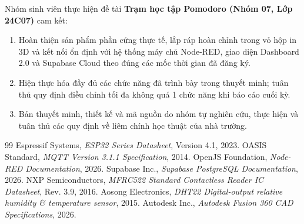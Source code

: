 Nhóm sinh viên thực hiện đề tài \textbf{Trạm học tập Pomodoro (Nhóm 07, Lớp 24C07)} cam kết:
\begin{enumerate}[leftmargin=1.0cm, noitemsep, topsep=1pt]
    \item Hoàn thiện sản phẩm phần cứng thực tế, lắp ráp hoàn chỉnh trong vỏ hộp in 3D và kết nối ổn định với hệ thống máy chủ Node-RED, giao diện Dashboard 2.0 và Supabase Cloud theo đúng các mốc thời gian đã đăng ký.
    \item Hiện thực hóa đầy đủ các chức năng đã trình bày trong thuyết minh; tuân thủ quy định điều chỉnh tối đa không quá 1 chức năng khi báo cáo cuối kỳ.
    \item Bản thuyết minh, thiết kế và mã nguồn do nhóm tự nghiên cứu, thực hiện và tuân thủ các quy định về liêm chính học thuật của nhà trường.
\end{enumerate}

\begin{thebibliography}{99}
    \setlength{\itemsep}{0pt}
    \setlength{\parskip}{0pt}
    \small
     Espressif Systems, \textit{ESP32 Series Datasheet}, Version 4.1, 2023.
     OASIS Standard, \textit{MQTT Version 3.1.1 Specification}, 2014.
     OpenJS Foundation, \textit{Node-RED Documentation}, 2026.
     Supabase Inc., \textit{Supabase PostgreSQL Documentation}, 2026.
     NXP Semiconductors, \textit{MFRC522 Standard Contactless Reader IC Datasheet}, Rev. 3.9, 2016.
     Aosong Electronics, \textit{DHT22 Digital-output relative humidity \& temperature sensor}, 2015.
     Autodesk Inc., \textit{Autodesk Fusion 360 CAD Specifications}, 2026.
\end{thebibliography}
